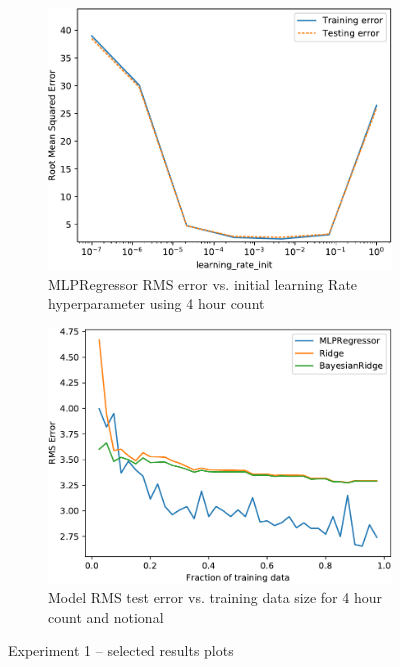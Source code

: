 \begin{figure}[!ht]
    \strut\\
    \begin{subfigure}[t]{.475\linewidth}\centering
        \includegraphics[width=1\linewidth]{./figures/Ch4fig5d}
        \caption{MLPRegressor RMS error vs. initial learning Rate hyperparameter using 4 hour count}\label{Ch4Fig:3c}
    \end{subfigure}\hfill%
    \begin{subfigure}[t]{.475\linewidth}\centering
        \includegraphics[width=1\linewidth]{./figures/Ch4fig5c}
        \caption{Model RMS test error vs. training data size for 4 hour count and notional}\label{Ch4Fig:3d}
    \end{subfigure}%
    \caption{Experiment 1 -- selected results plots}\label{Ch4Fig:3}
\end{figure}

